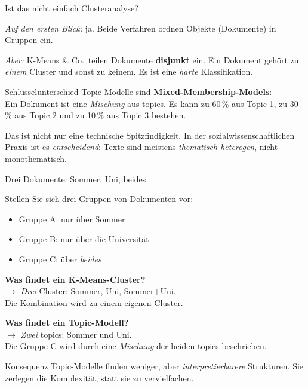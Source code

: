 \documentclass[aspectratio=169,11pt]{beamer}
\let\oldemph\emph
\renewcommand{\emph}[1]{{\color{solCyan}\oldemph{#1}}}
\let\oldtextbf\textbf
\renewcommand{\textbf}[1]{{\color{solBase3}\oldtextbf{#1}}}
\begin{document}
\begin{frame}{Ist das nicht einfach Clusteranalyse?}

  \emph{Auf den ersten Blick:} ja. Beide Verfahren ordnen Objekte
  (Dokumente) in Gruppen ein.

  \vfill
  \emph{Aber:} K-Means \& Co.\ teilen Dokumente \textbf{disjunkt} ein.
  Ein Dokument gehört zu \emph{einem} Cluster und sonst zu keinem.
  Es ist eine \emph{harte} Klassifikation.

  \vfill
  \begin{block}{Schlüsselunterschied}
    Topic-Modelle sind \textbf{Mixed-Membership-Models}:
    \\[4pt]
    Ein Dokument ist eine \emph{Mischung} aus topics. Es kann zu 60\,\%
    aus Topic 1, zu 30\,\% aus Topic 2 und zu 10\,\% aus Topic 3 bestehen.
  \end{block}

  \vfill
  Das ist nicht nur eine technische Spitzfindigkeit. In der
  sozialwissenschaftlichen Praxis ist es \emph{entscheidend}: Texte
  sind meistens \emph{thematisch heterogen}, nicht monothematisch.

\end{frame}

\begin{frame}{Drei Dokumente: Sommer, Uni, beides}

  Stellen Sie sich drei Gruppen von Dokumenten vor:
  \begin{itemize}
    \item Gruppe A: nur über Sommer
    \item Gruppe B: nur über die Universität
    \item Gruppe C: über \emph{beides}
  \end{itemize}

  \vfill
  \textbf{Was findet ein K-Means-Cluster?}\\
  $\rightarrow$ \emph{Drei} Cluster: Sommer, Uni, Sommer+Uni. \\
  Die Kombination wird zu einem eigenen Cluster.

  \vfill
  \textbf{Was findet ein Topic-Modell?}\\
  $\rightarrow$ \emph{Zwei} topics: Sommer und Uni. \\
  Die Gruppe C wird durch eine \emph{Mischung} der beiden topics
  beschrieben.

  \vfill
  \begin{block}{Konsequenz}
    Topic-Modelle finden weniger, aber \emph{interpretierbarere}
    Strukturen. Sie zerlegen die Komplexität, statt sie zu vervielfachen.
  \end{block}

\end{frame}
\end{document}
